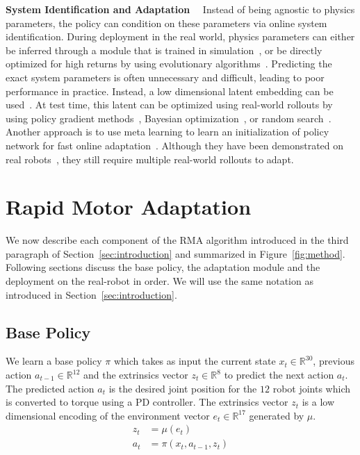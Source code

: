\documentclass[conference]{IEEEtran}
\begin{document}
\vspace{0.6em}\noindent\textbf{System Identification and Adaptation}$\quad$
Instead of being agnostic to physics parameters, the policy can condition on these parameters via online system identification. During deployment in the real world, physics parameters can either be inferred through a module that is trained in simulation~\cite{yu2017preparing}, or be directly optimized for high returns by using evolutionary algorithms~\cite{yu2018policy}. Predicting the exact system parameters is often unnecessary and difficult, leading to poor performance in practice.
Instead, a low dimensional latent embedding can be used~\cite{peng2020learning,zhou2019environment}. At test time, this latent can be optimized using real-world rollouts by using policy gradient methods~\cite{peng2020learning}, Bayesian optimization~\cite{yu2019biped}, or random search~\cite{yu2020learning}. Another approach is to use meta learning to learn an initialization of policy network for fast online adaptation~\cite{finn2017model}. Although they have been demonstrated on real robots~\cite{song2020rapidly, clavera2018learning}, they still require multiple real-world rollouts to adapt. 


\section{Rapid Motor Adaptation}
\label{sec:method}
We now describe each component of the RMA algorithm introduced in the third paragraph of Section~\ref{sec:introduction} and summarized in Figure~\ref{fig:method}. Following sections discuss the base policy, the adaptation module and the deployment on the real-robot in order. We will use the same notation as introduced in Section~\ref{sec:introduction}.
 

\subsection{Base Policy}
We learn a base policy $\pi$ which takes as input the current state $x_t \in \mathbb{R}^{30}$, previous action $a_{t-1} \in \mathbb{R}^{12}$ and the extrinsics vector $z_t \in \mathbb{R}^{8}$ to predict the next action $a_t$. The predicted action $a_t$ is the desired joint position for the $12$ robot joints which is converted to torque using a PD controller. The extrinsics vector $z_t$ is a low dimensional encoding of the environment vector $e_t \in \mathbb{R}^{17}$ generated by $\mu$. 
\begin{align}
    z_t &= \mu(e_t)  \label{eq:mu}  \\
    a_t &= \pi(x_t, a_{t-1}, z_t) \label{eq:pi}
\end{align}
\end{document}

